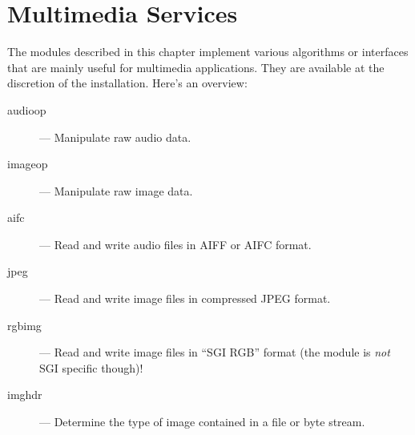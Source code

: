 \chapter{Multimedia Services}
\label{mmedia}

The modules described in this chapter implement various algorithms or
interfaces that are mainly useful for multimedia applications.  They
are available at the discretion of the installation.  Here's an overview:

\begin{description}

\item[audioop]
--- Manipulate raw audio data.

\item[imageop]
--- Manipulate raw image data.

\item[aifc]
--- Read and write audio files in AIFF or AIFC format.

\item[jpeg]
--- Read and write image files in compressed JPEG format.

\item[rgbimg]
--- Read and write image files in ``SGI RGB'' format (the module is
\emph{not} SGI specific though)!

\item[imghdr]
--- Determine the type of image contained in a file or byte stream.

\end{description}
